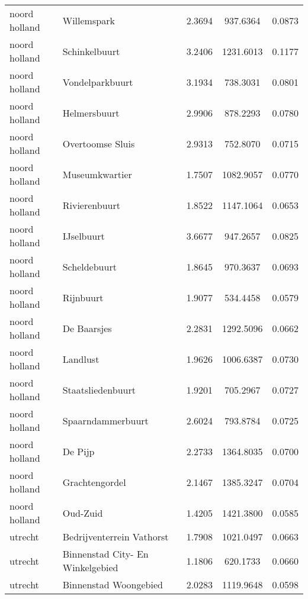 \begin{longtable}{llccc}
	noord holland & Willemspark                      & 2.3694  & 937.6364  & 0.0873          \\
	noord holland & Schinkelbuurt                    & 3.2406  & 1231.6013 & 0.1177          \\
	noord holland & Vondelparkbuurt                  & 3.1934  & 738.3031  & 0.0801          \\
	noord holland & Helmersbuurt                     & 2.9906  & 878.2293  & 0.0780          \\
	noord holland & Overtoomse Sluis                 & 2.9313  & 752.8070  & 0.0715          \\
	noord holland & Museumkwartier                   & 1.7507  & 1082.9057 & 0.0770          \\
	noord holland & Rivierenbuurt                    & 1.8522  & 1147.1064 & 0.0653          \\
	noord holland & IJselbuurt                       & 3.6677  & 947.2657  & 0.0825          \\
	noord holland & Scheldebuurt                     & 1.8645  & 970.3637  & 0.0693          \\
	noord holland & Rijnbuurt                        & 1.9077  & 534.4458  & 0.0579          \\
	noord holland & De Baarsjes                      & 2.2831  & 1292.5096 & 0.0662          \\
	noord holland & Landlust                         & 1.9626  & 1006.6387 & 0.0730          \\
	noord holland & Staatsliedenbuurt                & 1.9201  & 705.2967  & 0.0727          \\
	noord holland & Spaarndammerbuurt                & 2.6024  & 793.8784  & 0.0725          \\
	noord holland & De Pijp                          & 2.2733  & 1364.8035 & 0.0700          \\
	noord holland & Grachtengordel                   & 2.1467  & 1385.3247 & 0.0704          \\
	noord holland & Oud-Zuid                         & 1.4205  & 1421.3800 & 0.0585          \\
	utrecht       & Bedrijventerrein Vathorst        & 1.7908  & 1021.0497 & 0.0663          \\
	utrecht       & Binnenstad City- En Winkelgebied & 1.1806  & 620.1733  & 0.0660          \\
	utrecht       & Binnenstad Woongebied            & 2.0283  & 1119.9648 & 0.0598          \\

\end{longtable}
